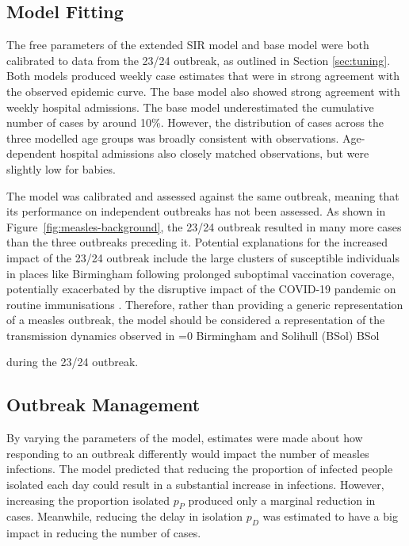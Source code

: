 \documentclass[12pt]{article}
\newcounter{bsol}
\newcommand{\bsol}{%
    \ifnum\value{bsol}=0
        \stepcounter{bsol}%
        Birmingham and Solihull (BSol)%
        \else
        BSol%
    \fi%
    \xspace
}
\begin{document}
\subsection{Model Fitting}

The free parameters of the extended SIR model and base model were both calibrated to data from the 23/24 outbreak, as outlined in Section \ref{sec:tuning}. Both models produced weekly case estimates that were in strong agreement with the observed epidemic curve. The base model also showed strong agreement with weekly hospital admissions. The base model underestimated the cumulative number of cases by around 10\%. However, the distribution of cases across the three modelled age groups was broadly consistent with observations. Age-dependent hospital admissions also closely matched observations, but were slightly low for babies.

The model was calibrated and assessed against the same outbreak, meaning that its performance on independent outbreaks has not been assessed. As shown in Figure~\ref{fig:measles-background}, the 23/24 outbreak resulted in many more cases than the three outbreaks preceding it. Potential explanations for the increased impact of the 23/24 outbreak include the large clusters of susceptible individuals in places like Birmingham following prolonged suboptimal vaccination coverage, potentially exacerbated by the disruptive impact of the COVID-19 pandemic on routine immunisations \cite{jary2025sociodemographic, UKHSA2024AnnualReport}. Therefore, rather than providing a generic representation of a measles outbreak, the model should be considered a representation of the transmission dynamics observed in \bsol during the 23/24 outbreak.


\subsection{Outbreak Management}

By varying the parameters of the model, estimates were made about how responding to an outbreak differently would impact the number of measles infections. The model predicted that reducing the proportion of infected people isolated each day could result in a substantial increase in infections. However, increasing the proportion isolated $p_P$ produced only a marginal reduction in cases. Meanwhile, reducing the delay in isolation $p_D$ was estimated to have a big impact in reducing the number of cases. 
\end{document}
